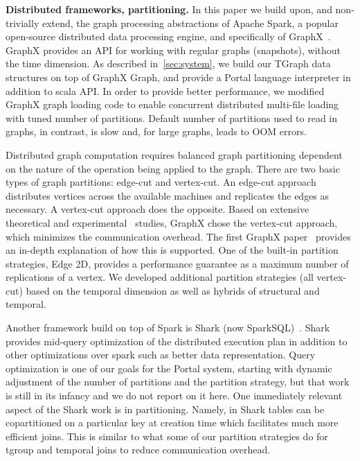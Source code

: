 {\bf Distributed frameworks, partitioning.}  In this paper we build
upon, and non-trivially extend, the graph processing abstractions of
Apache Spark, a popular open-source distributed data processing
engine, and specifically of
GraphX~\cite{DBLP:conf/osdi/GonzalezXDCFS14}.  GraphX provides an API
for working with regular graphs (snapshots), without the time
dimension.  As described in~\ref{sec:system}, we build our TGraph data
structures on top of GraphX Graph, and provide a Portal language
interpreter in addition to scala API.  In order to provide better
performance, we modified GraphX graph loading code to enable
concurrent distributed multi-file loading with tuned number of
partitions.  Default number of partitions used to read in graphs, in
contrast, is slow and, for large graphs, leads to OOM errors.

Distributed graph computation requires balanced graph partitioning
dependent on the nature of the operation being applied to the graph.
There are two basic types of graph partitions: edge-cut and
vertex-cut.  An edge-cut approach distributes vertices across the
available machines and replicates the edges as necessary.  A
vertex-cut approach does the opposite.  Based on extensive theoretical
and experimental~\cite{Gonzalez2012} studies, GraphX chose the
vertex-cut approach, which minimizes the communication overhead.  The
first GraphX paper~\cite{Xin2013} provides an in-depth explanation of
how this is supported.  One of the built-in partition strategies, Edge
2D, provides a performance guarantee as a maximum number of
replications of a vertex.  We developed additional partition
strategies (all vertex-cut) based on the temporal dimension as well as
hybrids of structural and temporal.

Another framework build on top of Spark is Shark (now
SparkSQL)~\cite{Xin2013Shark}.  Shark provides mid-query optimization
of the distributed execution plan in addition to other optimizations
over spark such as better data representation.  Query optimization is
one of our goals for the Portal system, starting with dynamic
adjustment of the number of partitions and the partition strategy, but
that work is still in its infancy and we do not report on it here.
One immediately relevant aspect of the Shark work is in partitioning.
Namely, in Shark tables can be copartitioned on a particular key at
creation time which facilitates much more efficient joins.  This is
similar to what some of our partition strategies do for tgroup and
temporal joins to reduce communication overhead.

